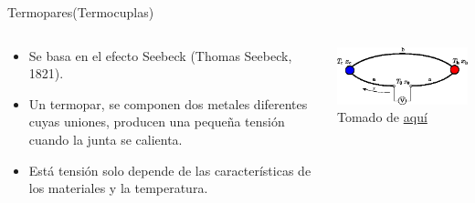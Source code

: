 \documentclass[aspectratio=169]{beamer}
\begin{document}
\begin{frame}{Termopares(Termocuplas)}
    \begin{columns}[c, onlytextwidth]
        \begin{column}{0.55\textwidth}
            \begin{itemize}
                \item Se basa en el efecto Seebeck (Thomas Seebeck, 1821). 
                \item Un termopar, se componen dos metales diferentes cuyas uniones, producen una pequeña tensión cuando la junta se calienta. 
                \item Está tensión solo depende de las características de los materiales y la temperatura. 
            \end{itemize}
        \end{column}
        \begin{column}{0.40\textwidth}
        \includegraphics[width=6cm]{fig/seebeekc.png}
            \tiny{Tomado de \href{https://www.iue.tuwien.ac.at/phd/mwagner/node14.html}{aquí}}
        \end{column}
    \end{columns}
\end{frame}
\end{document}

